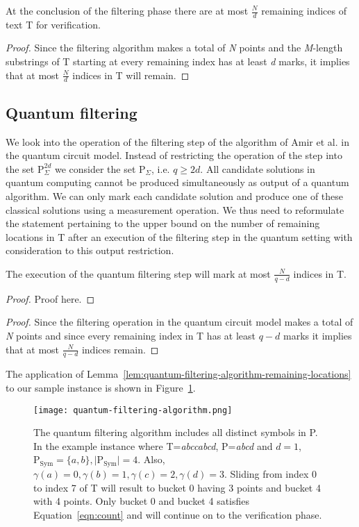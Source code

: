 \begin{lemma}
\label{lem:Amir-filtering-algorithm-remaining-locations}
	At the conclusion of the filtering phase there are at most $\frac{N}{d}$ remaining indices of text T for verification.
\end{lemma}
\begin{proof}
	Since the filtering algorithm makes a total of \textit{N} points and the \textit{M}-length substrings of T starting at every remaining index has at least \textit{d} marks, it implies that at most $\frac{N}{d}$ indices in T will remain.
\end{proof}

\subsection{Quantum filtering}
We look into the operation of the filtering step of the algorithm of Amir et al. in the quantum circuit model. Instead of restricting the operation of the step into the set $\text{P}_{\Sigma}^{2d}$ we consider the set $\text{P}_{\Sigma}$, i.e. $q \geq 2d$. All candidate solutions in quantum computing cannot be produced simultaneously as output of a quantum algorithm. We can only mark each candidate solution and produce one of these classical solutions using a measurement operation. We thus need to reformulate the statement pertaining to the upper bound on the number of remaining locations in T after an execution of the filtering step in the quantum setting with consideration to this output restriction.

\begin{lemma}
The execution of the quantum filtering step will mark at most $\frac{N}{q-d}$ indices in T.
\end{lemma}
\begin{proof}
Proof here.
\end{proof}
\begin{proof}
	Since the filtering operation in the quantum circuit model makes a total of \textit{N} points and since every remaining index in T has at least $q-d$ marks it implies that at most $\frac{N}{q-d}$ indices remain.
\end{proof}

The application of Lemma~\ref{lem:quantum-filtering-algorithm-remaining-locations} to our sample instance is shown in Figure~\ref{fig:quantum-filtering-algorithm}.
\begin{figure}[h!]
	\centering
	\texttt{[image: quantum-filtering-algorithm.png]}
	\caption{The quantum filtering algorithm includes all distinct symbols in P. In the example instance where T=\textit{abccabcd}, P=\textit{abcd} and $d=1$, $\mathrm{P}_{\mathrm{Sym}} = \{a,b\}, \vert \mathrm{P}_{\mathrm{Sym}} \vert = 4$. Also, $\gamma(a)=0,\gamma(b)=1,\gamma(c)=2, \gamma(d)=3$. Sliding from index 0 to index 7 of T will result to bucket 0 having 3 points and bucket 4 with 4 points. Only bucket 0 and bucket 4 satisfies Equation~\ref{eqn:count} and will continue on to the verification phase.}
	\label{fig:quantum-filtering-algorithm}
\end{figure}


